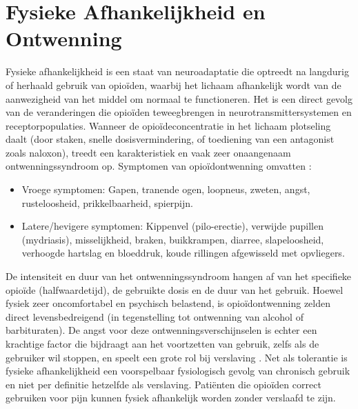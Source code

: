 \documentclass[11pt, a4paper]{report} %
\begin{document}
\section{Fysieke Afhankelijkheid en Ontwenning}
Fysieke afhankelijkheid is een staat van neuroadaptatie die optreedt na langdurig of herhaald gebruik van opioïden, waarbij het lichaam afhankelijk wordt van de aanwezigheid van het middel om normaal te functioneren. Het is een direct gevolg van de veranderingen die opioïden teweegbrengen in neurotransmittersystemen en receptorpopulaties. Wanneer de opioïdeconcentratie in het lichaam plotseling daalt (door staken, snelle dosisvermindering, of toediening van een antagonist zoals naloxon), treedt een karakteristiek en vaak zeer onaangenaam ontwenningssyndroom op. Symptomen van opioïdontwenning omvatten \parencite{Cicero2017Review}:
\begin{itemize}
    \item Vroege symptomen: Gapen, tranende ogen, loopneus, zweten, angst, rusteloosheid, prikkelbaarheid, spierpijn.
    \item Latere/hevigere symptomen: Kippenvel (pilo-erectie), verwijde pupillen (mydriasis), misselijkheid, braken, buikkrampen, diarree, slapeloosheid, verhoogde hartslag en bloeddruk, koude rillingen afgewisseld met opvliegers.
\end{itemize}
De intensiteit en duur van het ontwenningssyndroom hangen af van het specifieke opioïde (halfwaardetijd), de gebruikte dosis en de duur van het gebruik. Hoewel fysiek zeer oncomfortabel en psychisch belastend, is opioïdontwenning zelden direct levensbedreigend (in tegenstelling tot ontwenning van alcohol of barbituraten). De angst voor deze ontwenningsverschijnselen is echter een krachtige factor die bijdraagt aan het voortzetten van gebruik, zelfs als de gebruiker wil stoppen, en speelt een grote rol bij verslaving \parencite{Cicero2017Review}. Net als tolerantie is fysieke afhankelijkheid een voorspelbaar fysiologisch gevolg van chronisch gebruik en niet per definitie hetzelfde als verslaving. Patiënten die opioïden correct gebruiken voor pijn kunnen fysiek afhankelijk worden zonder verslaafd te zijn.
\end{document}
